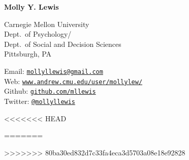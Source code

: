 \documentclass[letterpaper]{article}
\def\name{Molly Y.  Lewis}
\begin{document}
\centerline{\huge \bf \name}
\vspace{0.25in}


 \normalsize
  \begin{multicols}{2}
\begin{flushleft}
  Carnegie Mellon University  \\
  Dept.\ of Psychology/ \\
  Dept.\ of Social and Decision Sciences\\
  Pittsburgh, PA
\end{flushleft}
\begin{flushleft}
Email: \href{mailto:mollyllewis@gmail.com}{\tt mollyllewis@gmail.com}\\
Web: \href{http://www.andrew.cmu.edu/user/mollylew/}{\tt www.andrew.cmu.edu/user/mollylew/}\\
Github: \href{https://github.com/mllewis}{\tt github.com/mllewis}\\
Twitter: \href{https://twitter.com/mollyllewis}{\tt @mollyllewis}\\

\end{flushleft}
<<<<<<< HEAD
 
=======

>>>>>>> 80ba30ed832d7c33fa4eca3d5703a08e18e92828
\end{multicols}

\end{document}
